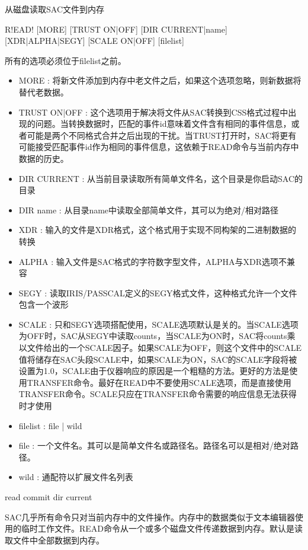 \label{cmd:read}

从磁盘读取SAC文件到内存

\begin{SACSTX}
R!EAD! [MORE] [TRUST ON|OFF] [DIR CURRENT|name] [XDR|ALPHA|SEGY] 
    [SCALE ON|OFF] [filelist]
\end{SACSTX}
所有的选项必须位于filelist之前。

\begin{itemize}
\item MORE : 将新文件添加到内存中老文件之后，如果这个选项忽略，则新数据将替代老数据。
\item TRUST ON|OFF : 这个选项用于解决将文件从SAC转换到CSS格式过程中出现的问题。当转换数据时，匹配的事件id意味着文件含有相同的事件信息，或者可能是两个不同格式合并之后出现的干扰。当TRUST打开时，SAC将更有可能接受匹配事件id作为相同的事件信息，这依赖于READ命令与当前内存中数据的历史。
\item DIR CURRENT : 从当前目录读取所有简单文件名，这个目录是你启动SAC的目录 
\item DIR name : 从目录name中读取全部简单文件，其可以为绝对/相对路径 
\item XDR : 输入的文件是XDR格式，这个格式用于实现不同构架的二进制数据的转换 
\item ALPHA : 输入文件是SAC格式的字符数字型文件，ALPHA与XDR选项不兼容 
\item SEGY : 读取IRIS/PASSCAL定义的SEGY格式文件，这种格式允许一个文件包含一个波形 
\item SCALE : 只和SEGY选项搭配使用，SCALE选项默认是关的。当SCALE选项为OFF时，SAC从SEGY中读取counts，当SCALE为ON时，SAC将counts乘以文件给出的一个SCALE因子。如果SCALE为OFF，则这个文件中的SCALE值将储存在SAC头段SCALE中，如果SCALE为ON，SAC的SCALE字段将被设置为1.0，SCALE由于仪器响应的原因是一个粗糙的方法。更好的方法是使用TRANSFER命令。最好在READ中不要使用SCALE选项，而是直接使用TRANSFER命令。SCALE只应在TRANSFER命令需要的响应信息无法获得时才使用 
\item filelist :  file | wild 
\item file : 一个文件名。其可以是简单文件名或路径名。路径名可以是相对/绝对路径。
\item wild : 通配符以扩展文件名列表 
\end{itemize}

\begin{SACDFT}
read commit dir current
\end{SACDFT}

SAC几乎所有命令只对当前内存中的文件操作。内存中的数据类似于文本编辑器使用的临时工作文件。READ命令从一个或多个磁盘文件传递数据到内存。默认是读取文件中全部数据到内存。

